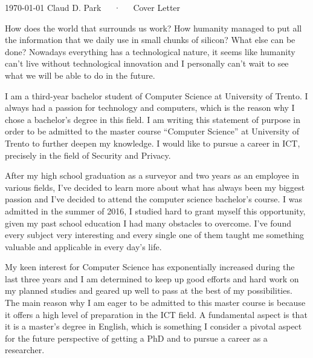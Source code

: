 \documentclass[11pt, a4paper]{awesome-cv}
\begin{document}
\makecvheader[R]

\makecvfooter
  {\today}
  {Claud D. Park~~~·~~~Cover Letter}
  {}

\makelettertitle

\begin{cvletter}

How does the world that surrounds us work? How humanity managed to put all the information that we daily use in small chunks of silicon? What else can be done? Nowadays everything has a technological nature, it seems like humanity can’t live without technological innovation and I personally can’t wait to see what we will be able to do in the future. 


I am a third-year bachelor student of Computer Science at University of Trento. I always had a passion for technology and computers, which is the reason why I chose a bachelor’s degree in this field. I am writing this statement of purpose in order to be admitted to the master course “Computer Science” at University of Trento to further deepen my knowledge. I would like to pursue a career in ICT, precisely in the field of Security and Privacy.


After my high school graduation as a surveyor and two years as an employee in various fields, I’ve decided to learn more about what has always been my biggest passion and I’ve decided to attend the computer science bachelor’s course. I was admitted in the summer of 2016, I studied hard to grant myself this opportunity, given my past school education I had many obstacles to overcome. I've found every subject very interesting and every single one of them taught me something valuable and applicable in every day’s life. 


My keen interest for Computer Science has exponentially increased during the last three years and I am determined to keep up good efforts and hard work on my planned studies and geared up well to pass at the best of my possibilities.
The main reason why I am eager to be admitted to this master course is because it offers a high level of preparation in the ICT field. A fundamental aspect is that it is a master’s degree in English, which is something I consider a pivotal aspect for the future perspective of getting a PhD and to pursue a career as a researcher.


\end{cvletter}


\makeletterclosing
\end{document}
